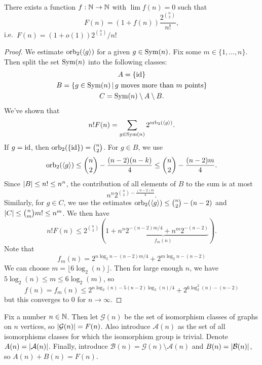 \begin{theorem}
  There exists a function $f: \mathbb{N} \to \mathbb{N}$ with $\lim f(n) = 0$ such that
  \[
	F(n) = (1 + f(n)) \frac{2^{\binom{n}{2}}}{n!},
  \]
  i.e.~$F(n) = (1 + o(1)) 2^{\binom{n}{2}} / {n!}$
\end{theorem}

\begin{proof}
  We estimate $\operatorname{orb}_2(\left< g \right>)$ for a given $g \in \operatorname{Sym}(n)$.
  Fix some $m \in \{1, \ldots, n\}$.
  Then split the set $\operatorname{Sym}(n)$ into the following classes:
  \begin{gather*}
	A = \{\operatorname{id}\} \\
	B = \{ g \in \operatorname{Sym}(n) \,|\, \text{$g$ moves more than $m$ points} \} \\
	C = \operatorname{Sym}(n) \setminus A \setminus B.
  \end{gather*}
  We've shown that
  \[
	n! F(n) = \sum_{g \in \operatorname{Sym}(n)} 2^{\operatorname{orb}_2(\left< g \right>)}.
  \]
  If $g = \operatorname{id}$, then $\operatorname{orb}_2(\{\operatorname{id}\}) = \binom{n}{2}$.
  For $g \in B$, we use
  \[
	\operatorname{orb}_2(\left< g \right>)
	\le \binom{n}{2} - \frac{(n-2)(n-k)}{4}
	\le \binom{n}{2} - \frac{(n-2) m}{4}.
  \]
  Since $\left| B \right| \le n! \le n^n$, the contribution of all elements of $B$ to the
  sum is at most
  \[
	n^n 2^{\binom{n}{2} - \frac{(n-2)m}{4}}.
  \]
  Similarly, for $g \in C$, we use the estimates $\operatorname{orb}_2(\left< g \right>)
  \le \binom{n}{2} - (n-2)$ and $\left| C \right| \le \binom{n}{m} m! \le n^m$.
  We then have
  \[
	n! F(n) \le 2^{\binom{n}{2}} \left(
	  1 + \underbrace{n^n 2^{\displaystyle -(n-2)m / 4} + n^m 2^{\displaystyle
		  -(n-2)}}_{f_m(n)}
	\right).
  \]
  Note that
  \[
	f_m(n) = 2^{\displaystyle n \log_2 n - (n-2)m / 4} + 2^{\displaystyle m \log_2 n - (n-2)}
  \]
  We can choose $m = \lfloor 6 \log_2(n) \rfloor$.
  Then for large enough $n$, we have $5 \log_2(n) \le m \le 6 \log_2(m)$, so
  \[
	f(n) = f_m(n)
	\le 2^{\displaystyle n \log_2(n) - 5 (n-2) \log_2(n) / 4}
	+ 2^{\displaystyle 6 \log_2^2(n) - (n-2)}
  \]
  but this converges to $0$ for $n \to \infty$.
\end{proof}

Fix a number $n \in \mathbb{N}$.
Then let $\mathcal{G}(n)$ be the set of isomorphism classes of graphs on $n$
vertices, so $\left| \mathcal{G}(n) \right| = F(n)$.
Also introduce $\mathcal{A}(n)$ as the set of all isomorphisms classes for which
the isomorphism group is trivial.
Denote $A(n) = \left| \mathcal{A}(n) \right|$.
Finally, introduce $\mathcal{B}(n) = \mathcal{G}(n) \setminus \mathcal{A}(n)$
and $B(n) = \left| \mathcal{B}(n) \right|$, so $A(n) + B(n) = F(n)$.

